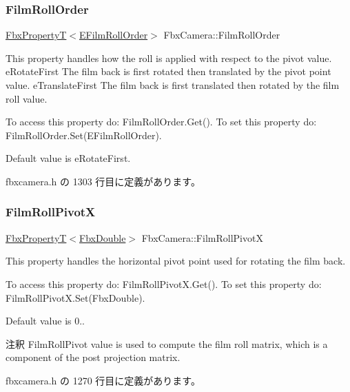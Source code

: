 \subsubsection{\texorpdfstring{Film\+Roll\+Order}{FilmRollOrder}}
{\footnotesize\ttfamily \hyperlink{class_fbx_property_t}{Fbx\+PropertyT}$<$\hyperlink{class_fbx_camera_a831d9b7ffcbf3611715eb2ad9108870b}{E\+Film\+Roll\+Order}$>$ Fbx\+Camera\+::\+Film\+Roll\+Order}

This property handles how the roll is applied with respect to the pivot value. e\+Rotate\+First The film back is first rotated then translated by the pivot point value. e\+Translate\+First The film back is first translated then rotated by the film roll value.

To access this property do\+: Film\+Roll\+Order.\+Get(). To set this property do\+: Film\+Roll\+Order.\+Set(\+E\+Film\+Roll\+Order).

Default value is e\+Rotate\+First. 

 fbxcamera.\+h の 1303 行目に定義があります。

\mbox{\label{class_fbx_camera_af8db195197a3f0a6729533842e00fd18}} 
\subsubsection{\texorpdfstring{Film\+Roll\+PivotX}{FilmRollPivotX}}
{\footnotesize\ttfamily \hyperlink{class_fbx_property_t}{Fbx\+PropertyT}$<$\hyperlink{fbxtypes_8h_a171e72a1c46fc15c1a6c9c31948c1c5b}{Fbx\+Double}$>$ Fbx\+Camera\+::\+Film\+Roll\+PivotX}

This property handles the horizontal pivot point used for rotating the film back.

To access this property do\+: Film\+Roll\+Pivot\+X.\+Get(). To set this property do\+: Film\+Roll\+Pivot\+X.\+Set(\+Fbx\+Double).

Default value is 0.. \begin{DoxyRemark}{注釈}
Film\+Roll\+Pivot value is used to compute the film roll matrix, which is a component of the post projection matrix. 
\end{DoxyRemark}


 fbxcamera.\+h の 1270 行目に定義があります。

\mbox{\label{class_fbx_camera_ab3034aa3a13b537c6542d8b45aa77eae}} 
